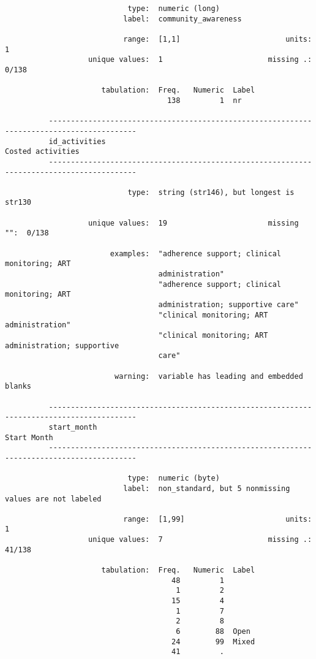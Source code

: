 \documentclass{article}
\begin{document}
\begin{verbatim}
                            type:  numeric (long)
                           label:  community_awareness
          
                           range:  [1,1]                        units:  1
                   unique values:  1                        missing .:  0/138
          
                      tabulation:  Freq.   Numeric  Label
                                     138         1  nr
          
          ------------------------------------------------------------------------------------------
          id_activities                                                            Costed activities
          ------------------------------------------------------------------------------------------
          
                            type:  string (str146), but longest is str130
          
                   unique values:  19                       missing "":  0/138
          
                        examples:  "adherence support; clinical monitoring; ART
                                   administration"
                                   "adherence support; clinical monitoring; ART
                                   administration; supportive care"
                                   "clinical monitoring; ART administration"
                                   "clinical monitoring; ART administration; supportive
                                   care"
          
                         warning:  variable has leading and embedded blanks
          
          ------------------------------------------------------------------------------------------
          start_month                                                                    Start Month
          ------------------------------------------------------------------------------------------
          
                            type:  numeric (byte)
                           label:  non_standard, but 5 nonmissing values are not labeled
          
                           range:  [1,99]                       units:  1
                   unique values:  7                        missing .:  41/138
          
                      tabulation:  Freq.   Numeric  Label
                                      48         1  
                                       1         2  
                                      15         4  
                                       1         7  
                                       2         8  
                                       6        88  Open
                                      24        99  Mixed
                                      41         .  
          

\end{verbatim}
\end{document}
